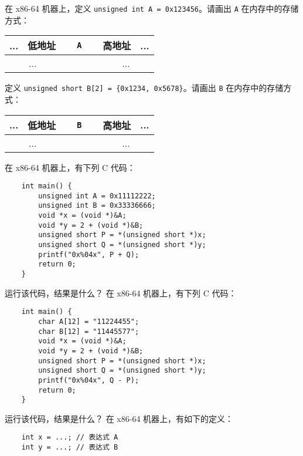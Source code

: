 	\begin{problems}
		\pro 在 x86-64 机器上，定义 \texttt{unsigned int A = 0x123456}。请画出 \texttt{A} 在内存中的存储方式：
		\begin{table}[H]
			\centering
			\begin{tabular}{|c|c|c|c|c|c|c|c|}
				\hline
				... & 低地址 & \multicolumn{4}{c|}{\texttt{A}} & 高地址 & ... \\ \hline
				\multicolumn{2}{|c|}{...} & {\qquad \qquad} & {\qquad \qquad} & {\qquad \qquad} & {\qquad \qquad} & \multicolumn{2}{c|}{...} \\ \hline
			\end{tabular}
		\end{table}
		定义 \texttt{unsigned short B[2] = \{0x1234, 0x5678\}}。请画出 \texttt{B} 在内存中的存储方式：
		\begin{table}[H]
			\centering
			\begin{tabular}{|c|c|c|c|c|c|c|c|}
				\hline
				... & 低地址 & \multicolumn{4}{c|}{\texttt{B}} & 高地址 & ... \\ \hline
				\multicolumn{2}{|c|}{...} & {\qquad \qquad} & {\qquad \qquad} & {\qquad \qquad} & {\qquad \qquad} & \multicolumn{2}{c|}{...} \\ \hline
			\end{tabular}
		\end{table}
		\pro 在 x86-64 机器上，有下列 C 代码：
		\begin{verbatim}
    int main() {
        unsigned int A = 0x11112222;
        unsigned int B = 0x33336666;
        void *x = (void *)&A;
        void *y = 2 + (void *)&B;
        unsigned short P = *(unsigned short *)x;
        unsigned short Q = *(unsigned short *)y;
        printf("0x%04x", P + Q);
        return 0;
    }
		\end{verbatim}
		运行该代码，结果是什么？
		\pro 在 x86-64 机器上，有下列 C 代码：
		\begin{verbatim}
    int main() {
        char A[12] = "11224455";
        char B[12] = "11445577";
        void *x = (void *)&A;
        void *y = 2 + (void *)&B;
        unsigned short P = *(unsigned short *)x;
        unsigned short Q = *(unsigned short *)y;
        printf("0x%04x", Q - P);
        return 0;
    }
		\end{verbatim}
		运行该代码，结果是什么？
		\pro 在 x86-64 机器上，有如下的定义：
		\begin{verbatim}
    int x = ...; // 表达式 A
    int y = ...; // 表达式 B

\end{verbatim}
\end{problems}
